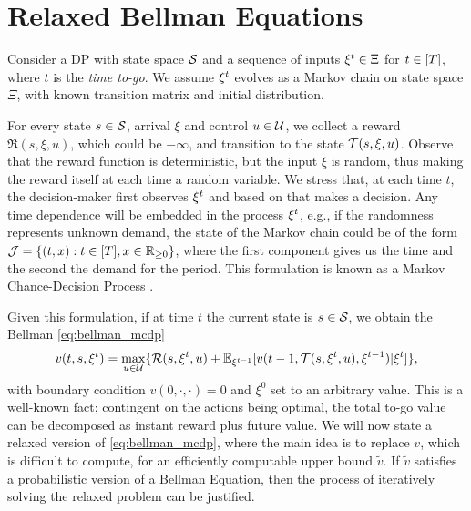 \section{Relaxed Bellman Equations}

Consider a DP with state space $\S$ and a sequence of inputs $\xit\in\Xi$ for $t\in[\T]$, where $t$ is the \emph{time to-go}.
We assume $\xit$ evolves as a Markov chain on state space $\Xi$, with known transition matrix and initial distribution.

For every state $s\in\S$, arrival $\xi$ and control $u\in\U$, we  collect a reward $\Re(s,\xi,u)$, which could be $-\infty$, and transition to the state $\Tr(s,\xi,u)$.
Observe that the reward function is deterministic, but the input $\xi$ is random, thus making the reward itself at each time a random variable.
We stress that, at each time $t$, the decision-maker first observes $\xit$ and based on that makes a decision.
Any time dependence will be embedded in the process $\xit$, e.g., if the randomness represents unknown demand, the state of the Markov chain could be of the form $\J=\crl{(t,x):t\in[\T],x\in\Rp}$, where the first component gives us the time and the second the demand for the period.
This formulation is known as a Markov Chance-Decision Process \cite[chap 13]{online_book}.

Given this formulation, if at time $t$ the current state is $s\in\S$, we obtain the Bellman \cref{eq:bellman_mcdp}
\begin{equation}\label{eq:bellman_mcdp}
v(t,s,\xit) = \max_{u\in\U}\crl{\Re(s,\xit,u) +\E_{\xi^{t-1}}[v(t-1,\Tr(s,\xit,u),\xi^{t-1})|\xit]},
\end{equation}
with boundary condition $v(0,\cdot,\cdot)=0$ and $\xi^0$ set to an arbitrary value.
This is a well-known fact; contingent on the actions being optimal, the total to-go value can be decomposed as instant reward plus future value.
We will now state a relaxed version of \cref{eq:bellman_mcdp}, where the main idea is to replace $v$, which is difficult to compute, for an efficiently computable upper bound $\tilde v$.
If $\tilde v$ satisfies a probabilistic version of a Bellman Equation, then the process of iteratively solving the relaxed problem can be justified.

